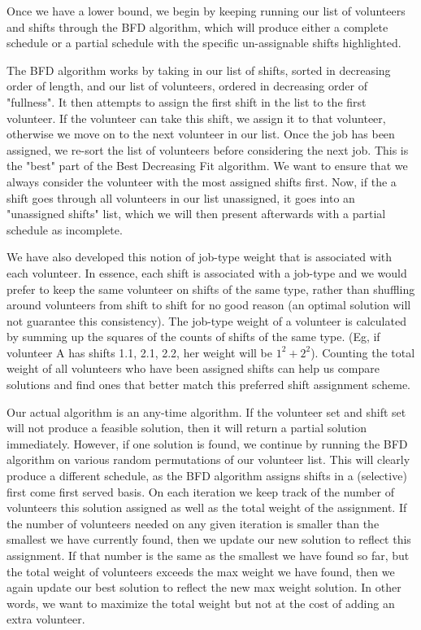 \documentclass[11pt]{article}
\theoremstyle{definition}
\begin{document}
\begin{multicols}{2}
Once we have a lower bound, we begin by keeping running our list of volunteers and shifts through the BFD algorithm, which will produce either a complete schedule or a partial schedule with the specific un-assignable shifts
highlighted.

The BFD algorithm works by taking in our list of shifts, sorted in decreasing order of length, and our list of volunteers, ordered in decreasing order of "fullness". It then attempts to assign the first
shift in the list to the first volunteer. If the volunteer can take this shift, we assign it to that volunteer, otherwise we move on to the next volunteer in our list. Once the job has been assigned, we re-sort
the list of volunteers before considering the next job. This is the "best" part of the Best Decreasing Fit algorithm. We want to ensure that we always consider the volunteer with the most assigned shifts first. Now,
if the a shift goes through all volunteers in our list unassigned, it goes into an "unassigned shifts" list, which we will then present afterwards with a partial schedule as incomplete. 

We have also developed this notion of job-type weight that is associated with each volunteer. In essence, each shift is associated with a job-type and we would prefer to keep the same volunteer on shifts of the 
same type, rather than shuffling around volunteers from shift to shift for no good reason (an optimal solution will not guarantee this consistency). The job-type weight of a volunteer is calculated by summing up the
squares of the counts of shifts of the same type. (Eg, if volunteer A has shifts 1.1, 2.1, 2.2, her weight will be $1^2 + 2^2$). Counting the total weight of all volunteers who have been assigned shifts can help us compare
solutions and find ones that better match this preferred shift assignment scheme. 

Our actual algorithm is an any-time algorithm. If the volunteer set and shift set will not produce a feasible solution, then it will return a partial solution immediately. However, if one solution is found, we continue
by running the BFD algorithm on various random permutations of our volunteer list. This will clearly produce a different schedule, as the BFD algorithm assigns shifts in a (selective) first come first served basis. On each
iteration we keep track of the number of volunteers this solution assigned as well as the total weight of the assignment. If the number of volunteers needed on any given iteration is smaller than the smallest we have currently 
found, then we update our new solution to reflect this assignment. If that number is the same as the smallest we have found so far, but the total weight of volunteers exceeds the max weight we have found, then we again update
our best solution to reflect the new max weight solution. In other words, we want to maximize the total weight but not at the cost of adding an extra volunteer. 


\end{multicols}
\end{document}
